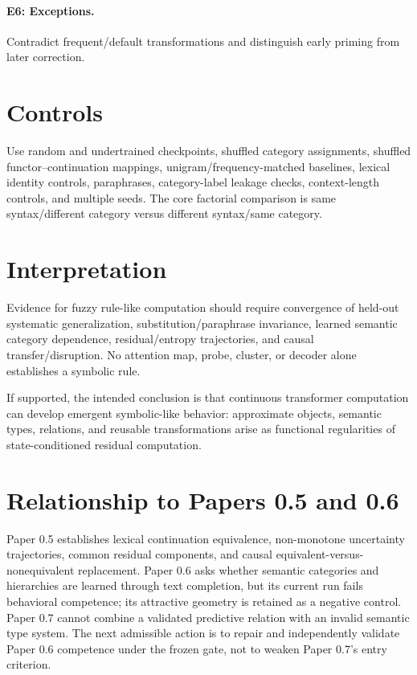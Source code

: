 \documentclass[11pt]{article}
\begin{document}
\paragraph{E6: Exceptions.} Contradict frequent/default transformations and distinguish early priming from later correction.

\section{Controls}
Use random and undertrained checkpoints, shuffled category assignments, shuffled functor--continuation mappings, unigram/frequency-matched baselines, lexical identity controls, paraphrases, category-label leakage checks, context-length controls, and multiple seeds. The core factorial comparison is same syntax/different category versus different syntax/same category.

\section{Interpretation}
Evidence for fuzzy rule-like computation should require convergence of held-out systematic generalization, substitution/paraphrase invariance, learned semantic category dependence, residual/entropy trajectories, and causal transfer/disruption. No attention map, probe, cluster, or decoder alone establishes a symbolic rule.

If supported, the intended conclusion is that continuous transformer computation can develop emergent symbolic-like behavior: approximate objects, semantic types, relations, and reusable transformations arise as functional regularities of state-conditioned residual computation.

\section{Relationship to Papers 0.5 and 0.6}
Paper 0.5 establishes lexical continuation equivalence, non-monotone uncertainty trajectories, common residual components, and causal equivalent-versus-nonequivalent replacement. Paper 0.6 asks whether semantic categories and hierarchies are learned through text completion, but its current run fails behavioral competence; its attractive geometry is retained as a negative control. Paper 0.7 cannot combine a validated predictive relation with an invalid semantic type system. The next admissible action is to repair and independently validate Paper 0.6 competence under the frozen gate, not to weaken Paper 0.7's entry criterion.
\end{document}
